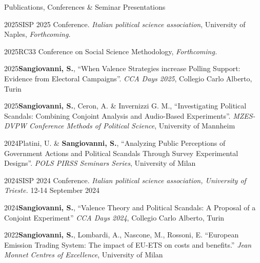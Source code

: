 \documentclass{cv} %
\begin{document}
\begin{rSection}{Publications, Conferences \& Seminar Presentations}
\subtitle{Conferences \& Seminar Presentations}

\begin{rPresSection}{2025}{SISP 2025 Conference. \textit{Italian political science association}, University of Naples, \textit{Forthcoming.}}
\end{rPresSection}\vspace{-0.2cm}
\begin{rPresSection}{2025}{RC33 Conference on Social Science Methodology, \textit{Forthcoming.}} 
\end{rPresSection}\vspace{-0.2cm}
\begin{rPresSection}{2025}{\textbf{Sangiovanni, S.}, “When Valence Strategies increase Polling Support: Evidence from Electoral Campaigns”. \textit{CCA Days 2025}, Collegio Carlo Alberto, Turin}
\end{rPresSection}\vspace{-0.2cm}
\begin{rPresSection}{2025}{\textbf{Sangiovanni, S.}, Ceron, A. \& Invernizzi G. M., “Investigating Political Scandals: Combining Conjoint Analysis and Audio-Based Experiments”. \textit{MZES-DVPW Conference Methods of Political Science}, University of Mannheim}
\end{rPresSection}\vspace{-0.2cm}
\begin{rPresSection}{2024}{Platini, U. \& \textbf{Sangiovanni, S.}, “Analyzing Public Perceptions of Government Actions and Political Scandals Through Survey Experimental Designs”. \textit{POLS PIRSS Seminars Series}, University of Milan}
\end{rPresSection}\vspace{-0.2cm}
\begin{rPresSection}{2024}{SISP 2024 Conference. \textit{Italian political science association, University of Trieste.} 12-14 September 2024}
\end{rPresSection}\vspace{-0.2cm}
\begin{rPresSection}{2024}{\textbf{Sangiovanni, S.}, “Valence Theory and Political Scandals: A Proposal of a Conjoint Experiment” \textit{CCA Days 2024}, Collegio Carlo Alberto, Turin}
\end{rPresSection}\vspace{-0.2cm}
\begin{rPresSection}{2022}{\textbf{Sangiovanni, S.}, Lombardi, A., Nascone, M., Rossoni, E. “European Emission Trading System: The impact of EU-ETS on costs and benefits.” \textit{Jean Monnet Centres of Excellence}, University of Milan}
\end{rPresSection}


\end{rSection}
\end{document}

